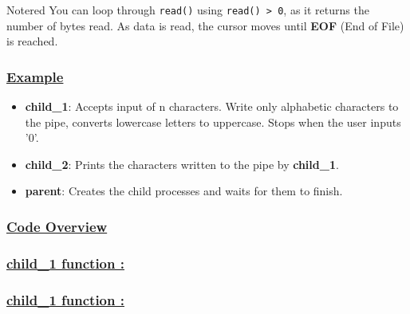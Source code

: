 \vspace{0.35cm}
\begin{prettyBox}{Note}{red}
    You can loop through \texttt{read()} using \texttt{read() > 0}, as it returns the number of bytes read. 
    As data is read, the cursor moves until \textbf{EOF} (End of File) is reached.
\end{prettyBox}

\vspace{1.25cm}

\subsubsection*{\underline{Example}}

\begin{itemize}
    \item \textbf{child\_1}: Accepts input of n characters. Write only alphabetic characters to the pipe, converts lowercase letters to uppercase. Stops when the user inputs '0'.
    \item \textbf{child\_2}: Prints the characters written to the pipe by \textbf{child\_1}.
    \item \textbf{parent}: Creates the child processes and waits for them to finish.
\end{itemize}

\newpage

\subsubsection*{\underline{Code Overview}}


\newpage

\subsubsection*{\underline{child\_1 function :}}


\vspace{0.5cm}

\subsubsection*{\underline{child\_1 function :}}


\vspace{1cm}

